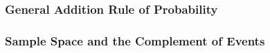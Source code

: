\documentclass[handout]{beamer}
\newcommand{\blue}[1]{\textcolor{blue2}{#1}}
\begin{document}
\begin{frame}[fragile]
\frametitle{General Addition Rule of Probability}

%
%
%
%
%
%
%
%
%
%
%
%

\end{frame}


\begin{frame}
\frametitle{Sample Space and the Complement of Events}
%
%
%
%

\end{frame}
\end{document}
